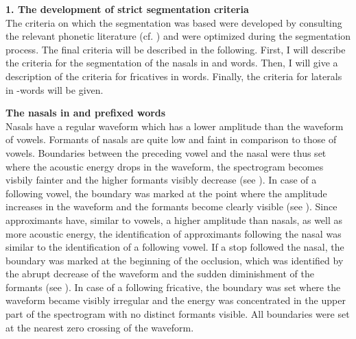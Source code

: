 \textbf{1. The development of strict segmentation criteria}\\

The criteria on which the segmentation was based were developed by consulting  the relevant phonetic literature (cf. \citealt{Ladefoged.1996,Johnson.1997b,Ladefoged.2003,Machac.2009,Ladefoged.2011}) and were optimized during the segmentation process. The final criteria will be described in the following. First, I will describe the criteria for the segmentation of the nasals in  and words. Then, I will give a description of the criteria for fricatives in words. Finally, the criteria for laterals in -words will be given.\\

\clearpage

\textbf{The nasals in  and prefixed words}\\

Nasals have a regular waveform which has a lower amplitude than the waveform of vowels. Formants of nasals are quite low and faint in comparison to those of vowels. Boundaries between the preceding vowel and the nasal were thus set where the acoustic energy drops in the waveform, the spectrogram becomes visbily fainter and the higher formants visibly decrease (see ). In case of a following vowel, the boundary was marked at the point where the amplitude increases in the waveform and the formants become clearly visible (see ).  Since approximants have, similar to vowels,  a higher amplitude than nasals, as well as more acoustic energy, the identification of approximants following the nasal was similar to the identification of a following vowel. If a stop followed the nasal, the boundary was marked at the beginning of the occlusion, which was identified by the abrupt decrease of the waveform and the sudden diminishment of the formants (see ). In case of a following fricative, the boundary was set where the waveform became visibly irregular and the energy was concentrated in the upper part of the spectrogram with no distinct formants visible. All boundaries were set at the nearest zero crossing of the waveform.\\



